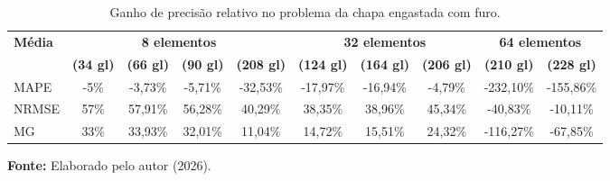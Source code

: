 \begin{table}[htbp]
    \centering
    \caption{Ganho de precisão relativo no problema da chapa engastada com furo.}
    \label{tab:5.7}
    \setlength{\tabcolsep}{3pt} %
    \small %
    \begin{tabular}{lccccccccc}
        \toprule
        \multirow{2}{*}{\textbf{Média}} & \multicolumn{4}{c}{\textbf{8 elementos}} & \multicolumn{3}{c}{\textbf{32 elementos}} & \multicolumn{2}{c}{\textbf{64 elementos}} \\
        \cmidrule(lr){2-5} \cmidrule(lr){6-8} \cmidrule(lr){9-10}
        & \textbf{(34 gl)} & \textbf{(66 gl)} & \textbf{(90 gl)} & \textbf{(208 gl)} & \textbf{(124 gl)} & \textbf{(164 gl)} & \textbf{(206 gl)} & \textbf{(210 gl)} & \textbf{(228 gl)} \\
        \midrule
        MAPE  & -5\%   & -3,73\% & -5,71\% & -32,53\% & -17,97\% & -16,94\% & -4,79\%  & -232,10\% & -155,86\% \\
        NRMSE & 57\%   & 57,91\% & 56,28\% & 40,29\%  & 38,35\%  & 38,96\%  & 45,34\%  & -40,83\%  & -10,11\%  \\
        MG    & 33\%   & 33,93\% & 32,01\% & 11,04\%  & 14,72\%  & 15,51\%  & 24,32\%  & -116,27\% & -67,85\%  \\
        \bottomrule
    \end{tabular}
    
    \vspace{0.2cm}
    \raggedright
    \textbf{Fonte:} Elaborado pelo autor (2026).
\end{table}

